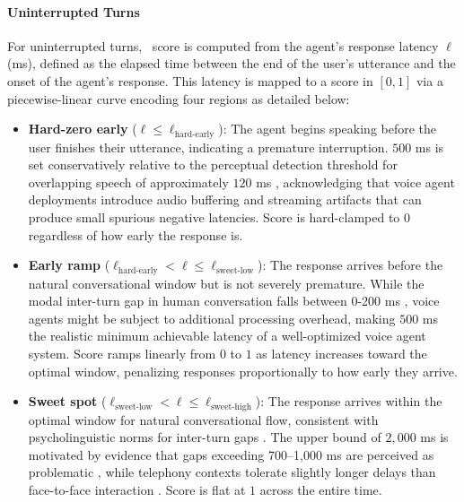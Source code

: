 \paragraph{Uninterrupted Turns}
For uninterrupted turns, \metricturntaking~score is computed from the agent's response latency $\ell$ (ms), defined as the elapsed time between the end of the user's utterance and the onset of the agent's response. This latency is mapped to a score in $[0,1]$ via a piecewise-linear curve encoding four regions as detailed below: 
\begin{itemize}[leftmargin=*, noitemsep]
\item \textbf{Hard-zero early} ($\ell \leq \ell_{\text{hard-early}}$): The agent begins speaking before the user finishes their utterance, indicating a premature interruption. $500$ ms is set conservatively relative to the perceptual detection threshold for overlapping speech of approximately $120$ ms 
\citep{heldner2011detection}, acknowledging that voice agent 
deployments introduce audio buffering and streaming artifacts that 
can produce small spurious negative latencies. Score is hard-clamped to $0$ regardless of how early the response is.

\item \textbf{Early ramp} ($\ell_{\text{hard-early}} < \ell \leq \ell_{\text{sweet-low}}$): The response arrives before the natural conversational window but is not severely premature. While the modal inter-turn gap in human conversation falls between 0-200 ms \citep{stivers2009universals, heldner2010pauses}, voice agents might  be subject to additional processing overhead, making $500$ ms the realistic minimum achievable latency of a well-optimized voice agent system. Score ramps linearly from $0$ to $1$ as latency increases toward the optimal window, penalizing responses proportionally to how early they arrive.

\item \textbf{Sweet spot} ($\ell_{\text{sweet-low}} < \ell \leq \ell_{\text{sweet-high}}$): The response arrives within the optimal window for natural conversational flow, consistent with psycholinguistic norms for inter-turn gaps \citep{stivers2009universals,skantze2021turntaking}. The upper bound 
of $2{,}000$ ms is motivated by evidence that gaps exceeding 
700--1{,}000 ms are perceived as problematic \citep{roberts2011judgments, levinson2015timing}, while telephony 
contexts tolerate slightly longer delays than face-to-face 
interaction \citep{skantze2021turntaking}. Score is flat at $1$ across the entire time.


\end{itemize}
